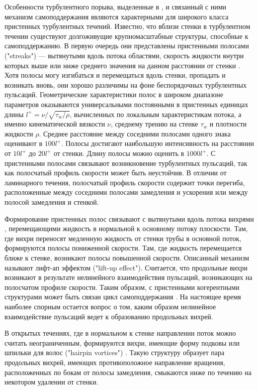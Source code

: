 Особенности турбулентного порыва, выделенные в \cite{Shimizu2009}, и связанный с ними механизм самоподдержания являются характерными для широкого класса пристенных турбулентных течений. Известно, что вблизи стенки в турбулентном течении существуют долгоживущие крупномасштабные структуры, способные к самоподдержанию. В первую очередь они представлены пристенными полосами ("streaks") --- вытянутыми вдоль потока областями, скорость жидкости внутри которых выше или ниже среднего значения на данном расстоянии от стенки \cite{Klebanoff1962, Kline1967}. Хотя полосы могу изгибаться и перемещаться вдоль стенки, пропадать и возникать вновь, они хорошо различимы на фоне беспорядочных турбулентных пульсаций. Геометрические характеристики полос в широком диапазоне параметров оказываются универсальными постоянными в пристенных единицах длины $l^+ = \nu / \sqrt{\tau_{w} / \rho}$, вычисленных по локальным характеристикам потока, а именно кинематической вязкости $\nu$, среднему трению на стенке $\tau_{w}$ и плотности жидкости $\rho$. Среднее расстояние между соседними полосами одного знака оценивают в $100 l^+$. Полосы достигают наибольшую интенсивность на расстоянии от $10 l^+$ до $20 l^+$ от стенки. Длину полосы можно оценить в $1000 l^+$. С пристенными полосами связывают возникновение турбулентных пульсаций, так как полосчатый профиль скорости может быть неустойчив. В отличии от ламинарного течения, полосчатый профиль скорости содержит точки перегиба, расположенные между соседними полосами замедления и ускорения или между полосой замедления и стенкой. 

Формирование пристенных полос связывают с вытянутыми вдоль потока вихрями \cite{Blackwelder1979, Jeong1997}, перемещающими жидкость в нормальной к основному потоку плоскости. Там, где вихри переносят медленную жидкость от стенки трубы в основной поток, формируются полосы пониженной скорости. Там, где жидкость перемещается ближе к стенке, возникают полосы повышенной скорости. Описанный механизм называют лифт-ап эффектом ("lift-up effect"). Считается, что продольные вихри возникают в результате нелинейного взаимодействия пульсаций, возникающих на полосчатом профиле скорости. Таким образом, с пристенными когерентными структурами может быть связан цикл самоподдержания \cite{Hamilton1995, Waleffe1997, Schoppa2002, Kawahara2003}. На настоящее время наиболее спорным остается вопрос о том, каким образом нелинейное взаимодействие пульсаций ведет к образованию продольных вихрей. 

В открытых течениях, где в нормальном к стенке направлении поток можно считать неограниченным, формируются вихри, имеющие форму подковы или шпильки для волос ("hairpin vortices") \cite{Head1981, Robinson1991, Adrian2000, Adrian2007}. Такую структуру образует пара продольных вихрей, имеющих противоположное направление вращения, расположенных по бокам от полосы замедления, смыкаются ниже по течению на некотором удалении от стенки. 

